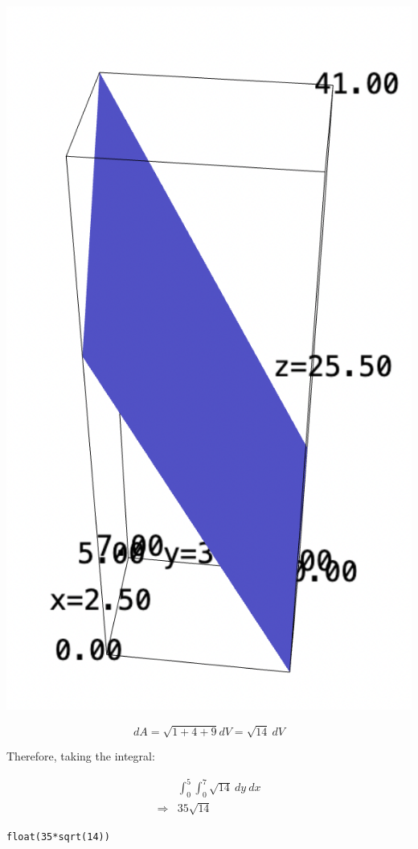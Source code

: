 \documentclass[letterpaper]{article}
\begin{document}
\begin{center}
\includegraphics[width=.9\linewidth]{2022-04-25_09-53-43_screenshot.png}
\end{center}

\begin{equation}
   dA = \sqrt{1+4+9} dV = \sqrt{14}\ dV
\end{equation}

Therefore, taking the integral:

\begin{align}
   &\int_0^5 \int_0^7 \sqrt{14}\ dy\ dx \\
\Rightarrow & 35\sqrt{14}
\end{align}

\begin{verbatim}
float(35*sqrt(14))
\end{verbatim}
\end{document}
